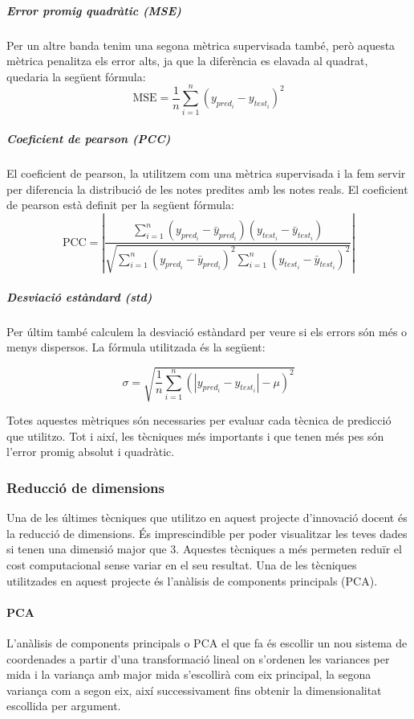 \documentclass[12pt,a4paper,catalan]{article}
\begin{document}
\subparagraph{Error promig quadràtic (MSE)}
Per un altre banda tenim una segona mètrica supervisada també, però aquesta mètrica penalitza els error alts, ja que la diferència es elavada al quadrat, quedaria la següent fórmula:
$$\mathrm{MSE}=\frac{1}{n}\sum_{i=1}^n(y_{pred_i}-y_{test_i})^2$$

\subparagraph{Coeficient de pearson (PCC)}
El coeficient de pearson, la utilitzem com una mètrica supervisada i la fem servir per diferencia la distribució de les notes predites amb les notes reals. El coeficient de pearson està definit per la següent fórmula:
$$\mathrm{PCC} =\left| \frac{\sum_{i=1}^n(y_{pred_i} - \bar{y}_{pred_i})(y_{test_i} - \bar{y}_{test_i})}{\sqrt{\sum_{i=1}^n(y_{pred_i} - \bar{y}_{pred_i})^2  \sum_{i=1}^n(y_{test_i} - \bar{y}_{test_i})^2}}\right|$$

\subparagraph{Desviació estàndard (std)}
Per últim també calculem la desviació estàndard per veure si els errors són més o menys dispersos. La fórmula utilitzada és la següent:

$$ \sigma = \sqrt{ \frac{1}{n} \sum_{i=1}^n (\left| y_{pred_i}-y_{test_i}\right| - \mu)^2 } $$

Totes aquestes mètriques són necessaries per evaluar cada tècnica de predicció que utilitzo. Tot i així, les tècniques més importants i que tenen més pes són l'error promig absolut i quadràtic.

\subsubsection{Reducció de dimensions}
Una de les últimes tècniques que utilitzo en aquest projecte d'innovació docent és la reducció de dimensions. És imprescindible per poder visualitzar les teves dades si tenen una dimensió major que 3. Aquestes tècniques a més permeten reduïr el cost computacional sense variar en el seu resultat. Una de les tècniques utilitzades en aquest projecte és l'anàlisis de components principals (PCA).

\paragraph{PCA}
L'anàlisis de components principals o PCA el que fa és escollir un nou sistema de coordenades a partir d'una transformació lineal on s'ordenen les variances per mida i la variança amb major mida s'escollirà com eix principal, la segona variança com a segon eix, així successivament fins obtenir la dimensionalitat escollida per argument.
\end{document}
